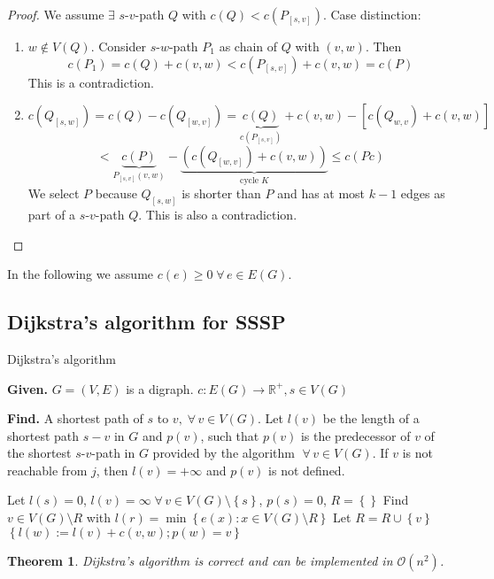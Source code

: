 \documentclass{article}
\newtheorem{theorem}{Theorem}
\newcommand{\set}[1]{\left\{#1\right\}}
\newcommand{\given}[1]{\textbf{Given.} #1\par}
\newcommand{\find}[1]{\textbf{Find.} #1\par}
\newcommand{\gath}[2]{$#1$-$#2$-path} %
\newcommand{\fall}{\;\forall\,}
\begin{document}
\begin{proof}
We assume $\exists$ \gath sv $Q$ with $c(Q) < c(P_{[s,v]})$. Case distinction:
\begin{enumerate}
  \item $w \notin V(Q)$. Consider \gath sw $P_1$ as chain of $Q$ with $(v, w)$. Then
    \[
      c(P_1) = c(Q) + c(v, w) < c(P_{[s,v]}) + c(v,w) = c(P)
    \]
    This is a contradiction.
  \item
    \[
      c(Q_{[s,w]}) = c(Q) - c(Q_{[w,v]})
        = \underbrace{c(Q)}_{c(P_{[s,v]})} + c(v,w) - [c(Q_{w,v}) + c(v,w)]
    \] \[
        < \underbrace{c(P)}_{P_{[s,v]}(v,w)}
          - \underbrace{\left(c(Q_{[w,v]}) + c(v,w)\right)}_{\text{cycle }K}
        \leq c(Pc)
    \]
    We select $P$ because $Q_{[s,w]}$ is shorter than $P$ and has at most $k-1$ edges as part of a \gath sv $Q$. This is also a contradiction.
\end{enumerate}
\end{proof}

In the following we assume $c(e) \geq 0 \fall e \in E(G)$.

\subsection{Dijkstra's algorithm for SSSP}
%
\begin{algorithm}
  \caption{Dijkstra's algorithm}
  \label{dijkstras-algo}
  \given{$G = (V, E)$ is a digraph. $c: E(G) \rightarrow \mathbb{R}^+, s \in V(G)$}
  \find{A shortest path of $s$ to $v, \fall v \in V(G)$. Let $l(v)$ be the length of a shortest path $s-v$ in $G$ and $p(v)$, such that $p(v)$ is the predecessor of $v$ of the shortest \gath sv in $G$ provided by the algorithm $\fall v \in V(G)$. If $v$ is not reachable from $j$, then $l(v) = +\infty$ and $p(v)$ is not defined.}
\begin{algorithmic}[1]
  \State Let $l(s) = 0$, $l(v) = \infty \fall v \in V(G) \setminus \set{s}$, $p(s) = 0$, $R = \set{}$
  \State Find $v \in V(G) \setminus R$ with $l(r) = \min\set{e(x) : x \in V(G) \setminus R}$ \label{dijkstra-redo}
  \State Let $R = R \cup \set{v}$
      \State $\set{l(w) := l(v) + c(v, w); p(w) = v}$
    \EndIf
  \EndFor
  \EndIf
\end{algorithmic}
\end{algorithm}

\begin{theorem}\label{satz-3.2}
  Dijkstra's algorithm is correct and can be implemented in $\mathcal{O}(n^2)$.
\end{theorem}
\end{document}
